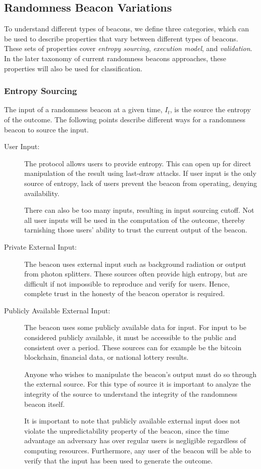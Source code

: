 \subsection{Randomness Beacon Variations}
 To understand different types of beacons, we define three categories, which can be used to describe properties that vary between different types of beacons.
These sets of properties cover \emph{entropy sourcing}, \emph{execution model}, and \emph{validation}.
In the later taxonomy of current randomness beacons approaches, these properties will also be used for classification.

\subsubsection{Entropy Sourcing}
The input of a randomness beacon at a given time, $I_t$, is the source the entropy of the outcome.
The following points describe different ways for a randomness beacon to source the input.
\begin{description}
    \item[User Input:]
        The protocol allows users to provide entropy.
        This can open up for direct manipulation of the result using last-draw attacks.
        If user input is the only source of entropy, lack of users prevent the beacon from operating, denying availability.

        There can also be too many inputs, resulting in input sourcing cutoff. Not all user inputs will be used in the computation of the outcome, thereby tarnishing those users' ability to trust the current output of the beacon.

    \item[Private External Input:]
        The beacon uses external input such as background radiation or output from photon splitters.
        These sources often provide high entropy, but are difficult if not impossible to reproduce and verify for users. Hence, complete trust in the honesty of the beacon operator is required.

    \item[Publicly Available External Input:]
        The beacon uses some publicly available data for input. For input to be considered publicly available, it must be accessible to the public and consistent over a period.
        These sources can for example be the bitcoin blockchain, financial data, or national lottery results.

        Anyone who wishes to manipulate the beacon's output must do so through the external source.
        For this type of source it is important to analyze the integrity of the source to understand the integrity of the randomness beacon itself.

        It is important to note that publicly available external input does not violate the unpredictability property of the beacon, since the time advantage an adversary has over regular users is negligible regardless of computing resources.
        Furthermore, any user of the beacon will be able to verify that the input has been used to generate the outcome.

\end{description}

